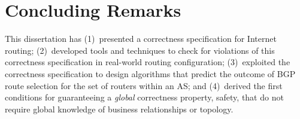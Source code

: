 

\section{Concluding Remarks}\label{sec:final}


This dissertation has (1)~presented a correctness specification for
Internet routing; (2)~developed tools and techniques to check for
violations of this correctness specification in real-world routing
configuration; (3)~exploited the correctness specification to design
algorithms that predict the outcome of BGP route selection for the set
of routers within an AS; and (4)~derived the first conditions for
guaranteeing a {\em global} correctness property, safety, that do not
require global knowledge of business relationships or topology.  

